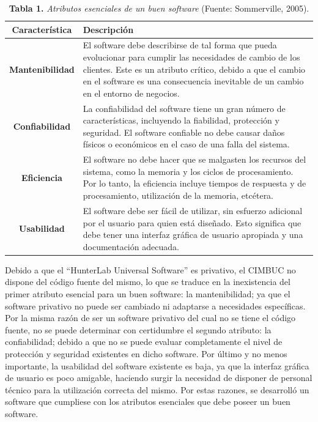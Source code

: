 \documentclass[12pt, a4paper]{article}
\begin{document}
\begin{table}[htb]
	\small
	\centering
	\setlength{\extrarowheight}{5pt}
	\begin{tabulary}{15cm}{|c|L|}
		\hline
		\textbf{Caracter\'{i}stica} & \textbf{Descripci\'{o}n}\\ \hline
		\textbf{Mantenibilidad} & El software debe describirse de tal forma que pueda evolucionar  para cumplir las necesidades de cambio de los 					clientes. Este es un atributo cr\'{i}tico, debido a que el cambio en el software es una consecuencia inevitable de un cambio en el entorno de 					negocios.\\ \hline
		\textbf{Confiabilidad} & La confiabilidad del software tiene un gran n\'{u}mero de caracter\'{i}sticas, incluyendo la fiabilidad, protecci\'{o}n y seguridad. El software confiable no debe causar da\~{n}os f\'{i}sicos o econ\'{o}micos en el caso de una falla del sistema.\\ \hline
		\textbf{Eficiencia} & El software no debe hacer que se malgasten los recursos del sistema, como la memoria y los ciclos de procesamiento. Por lo tanto, la eficiencia incluye tiempos de respuesta y de procesamiento, utilizaci\'{o}n de la memoria, etc\'{e}tera.\\ \hline
		\textbf{Usabilidad} & El software debe ser f\'{a}cil de utilizar, sin esfuerzo adicional por el usuario para quien est\'{a} dise\~{n}ado. Esto significa que debe tener una interfaz gr\'{a}fica de usuario apropiada y una documentaci\'{o}n adecuada.\\ \hline
	\end{tabulary}
	\caption{\textbf{Tabla 1.} \textit{Atributos esenciales de un buen software}		(Fuente: Sommerville, 2005).}
\end{table}
\FloatBarrier %
Debido a que el ``HunterLab Universal Software'' es privativo, el CIMBUC no dispone del c\'{o}digo fuente del mismo, lo que se traduce en la inexistencia del primer atributo esencial para un buen software: la mantenibilidad; ya que el software privativo no puede ser cambiado ni adaptarse a necesidades espec\'{i}ficas. Por la misma raz\'{o}n de ser un software privativo del cual no se tiene el c\'{o}digo fuente, no se puede determinar con certidumbre el segundo atributo: la confiabilidad; debido a que no se puede evaluar completamente el nivel de protecci\'{o}n y seguridad existentes en dicho software. Por \'{u}ltimo y no menos importante, la usabilidad del software existente es baja, ya que la interfaz gr\'{a}fica de usuario es poco amigable, haciendo surgir la necesidad de disponer de personal t\'{e}cnico para la utilizaci\'{o}n correcta del mismo. Por estas razones, se desarroll\'{o} un software que cumpliese con los atributos esenciales que debe poseer un buen software.
\end{document}
